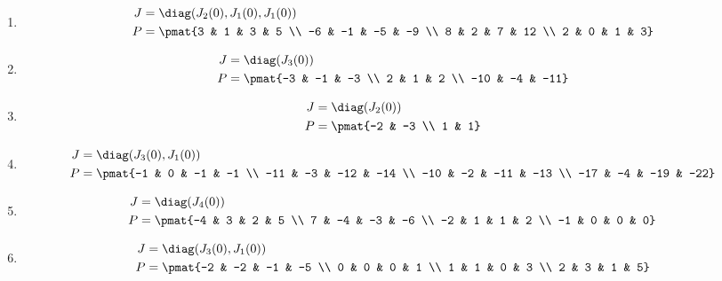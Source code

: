 \begin{enumerate}
\item

\begin{align*}
J &= \diag(J_{2}(0), J_{1}(0), J_{1}(0))\\
P &= \pmat{3 & 1 & 3 & 5 \\ -6 & -1 & -5 & -9 \\ 8 & 2 & 7 & 12 \\ 2 & 0 & 1 & 3}
\end{align*}

\item

\begin{align*}
J &= \diag(J_{3}(0))\\
P &= \pmat{-3 & -1 & -3 \\ 2 & 1 & 2 \\ -10 & -4 & -11}
\end{align*}

\item

\begin{align*}
J &= \diag(J_{2}(0))\\
P &= \pmat{-2 & -3 \\ 1 & 1}
\end{align*}

\item

\begin{align*}
J &= \diag(J_{3}(0), J_{1}(0))\\
P &= \pmat{-1 & 0 & -1 & -1 \\ -11 & -3 & -12 & -14 \\ -10 & -2 & -11 & -13 \\ -17 & -4 & -19 & -22}
\end{align*}

\item

\begin{align*}
J &= \diag(J_{4}(0))\\
P &= \pmat{-4 & 3 & 2 & 5 \\ 7 & -4 & -3 & -6 \\ -2 & 1 & 1 & 2 \\ -1 & 0 & 0 & 0}
\end{align*}

\item

\begin{align*}
J &= \diag(J_{3}(0), J_{1}(0))\\
P &= \pmat{-2 & -2 & -1 & -5 \\ 0 & 0 & 0 & 1 \\ 1 & 1 & 0 & 3 \\ 2 & 3 & 1 & 5}
\end{align*}


\end{enumerate}
